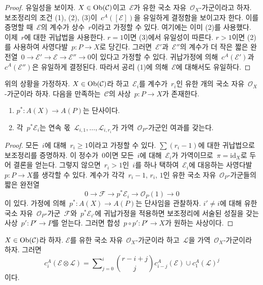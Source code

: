 \begin{proof}
\medskip\noindent
유일성을 보이자. $X \in \mathop{\mathrm{Ob}}\nolimits(\mathcal{C})$이고\  $\mathcal{E}$가 유한
국소 자유\  $\mathcal{O}_X$-가군이라고 하자. 보조정리의 조건 (1),
(2), (3)이\  $c^A([\mathcal{E}])$을 유일하게 결정함을 보이고자 한다.
이를 증명할 때\  $\mathcal{E}$의 계수가 상수\  $r$이라고 가정할 수
있다. 여기에는 이미 (2)를 사용했다. 이제\  $r$에 대한 귀납법을
사용한다. $r = 1$이면 (3)에서 유일성이 따른다. $r > 1$이면 (2)를
사용하여 사영다발\  $p : P \to X$로 당긴다. 그러면\ 
$\mathcal{E}'$과\  $\mathcal{E}''$의 계수가 더 작은 짧은 완전열\ 
$0 \to \mathcal{E}' \to \mathcal{E} \to \mathcal{E}'' \to 0$이
있다고 가정할 수 있다. 귀납가정에 의해\ 
$c^A(\mathcal{E}')$과\  $c^A(\mathcal{E}'')$은 유일하게 결정된다.
따라서 공리 (1)에 의해\  $\mathcal{E}$에 대해서도 유일하다.
\end{proof}

\begin{lemma}
\label{lemma-splitting-principle}
위의 상황을 가정하자. $X \in \mathop{\mathrm{Ob}}\nolimits(\mathcal{C})$라 하고\ 
$\mathcal{E}_i$를 계수가\  $r_i$인 유한 개의 국소 자유\ 
$\mathcal{O}_X$-가군이라 하자. 다음을 만족하는\  $\mathcal{C}$의
사상\  $p : P \to X$가 존재한다.
\begin{enumerate}
\item $p^* : A(X) \to A(P)$는 단사이다.
\item 각\  $p^*\mathcal{E}_i$는 연속 몫\ 
$\mathcal{L}_{i, 1}, \ldots, \mathcal{L}_{i, r_i}$가 가역\ 
$\mathcal{O}_P$-가군인 여과를 갖는다.
\end{enumerate}
\end{lemma}

\begin{proof}
모든\  $i$에 대해\  $r_i \geq 1$이라고 가정할 수 있다.
$\sum (r_i - 1)$에 대한 귀납법으로 보조정리를 증명하자. 이 정수가\ 
$0$이면 모든\  $i$에 대해\  $\mathcal{E}_i$가 가역이므로\ 
$\pi = \text{id}_X$로 두어 결론을 얻는다. 그렇지 않으면\ 
$r_i > 1$인\  $i$를 하나 택하여\  $\mathcal{E}_i$에 대응하는
사영다발\  $p : P \to X$를 생각할 수 있다. 계수가 각각\  $r_i - 1$,
$r_i$, $1$인 유한 국소 자유\  $\mathcal{O}_P$-가군들의 짧은 완전열
$$
0 \to \mathcal{F} \to p^*\mathcal{E}_i \to \mathcal{O}_P(1) \to 0
$$
이 있다. 가정에 의해\  $p^* : A(X) \to A(P)$는 단사임을 관찰하자.
$i' \not = i$에 대해 유한 국소 자유\  $\mathcal{O}_P$-가군\ 
$\mathcal{F}$와\  $p^*\mathcal{E}_{i'}$에 귀납가정을 적용하면
보조정리에 서술된 성질을 갖는 사상\  $p' : P' \to P$를 얻는다.
그러면 합성\  $p \circ p' : P' \to X$가 원하는 사상이다.
\end{proof}

\begin{lemma}
\label{lemma-chern-classes-E-tensor-L}
$X \in \mathop{\mathrm{Ob}}\nolimits(\mathcal{C})$라 하자. $\mathcal{E}$를 유한 국소 자유\ 
$\mathcal{O}_X$-가군이라 하고\  $\mathcal{L}$을 가역\ 
$\mathcal{O}_X$-가군이라 하자. 그러면
$$
c^A_i({\mathcal E} \otimes {\mathcal L})
=
\sum\nolimits_{j = 0}^i
\binom{r - i + j}{j} c^A_{i - j}({\mathcal E}) \cup c^A_1({\mathcal L})^j
$$
이다.
\end{lemma}

